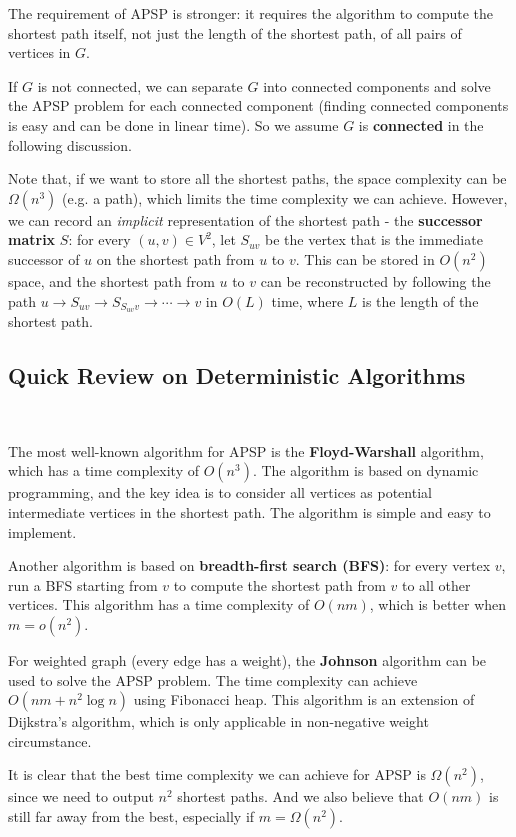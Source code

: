 \documentclass[11pt]{article}
\theoremstyle{plain}
\begin{document}
The requirement of APSP is stronger: it requires the algorithm to compute the shortest path itself, not just the length of the shortest path, of all pairs of vertices in $G$. 

If $G$ is not connected, we can separate $G$ into connected components and solve the APSP problem for each connected component (finding connected components is easy and can be done in linear time). So we assume $G$ is \textbf{connected} in the following discussion.

Note that, if we want to store all the shortest paths, the space complexity can be $\Omega(n^3)$ (e.g. a path), which limits the time complexity we can achieve. However, we can record an \emph{implicit} representation of the shortest path - the \textbf{successor matrix} $S$: for every $(u,v)\in V^2$, let $S_{uv}$ be the vertex that is the immediate successor of $u$ on the shortest path from $u$ to $v$. This can be stored in $O(n^2)$ space, and the shortest path from $u$ to $v$ can be reconstructed by following the path $u\to S_{uv}\to S_{S_{uv}v}\to\cdots\to v$ in $O(L)$ time, where $L$ is the length of the shortest path.

\subsection{Quick Review on Deterministic Algorithms}\

The most well-known algorithm for APSP is the \textbf{Floyd-Warshall} algorithm, which has a time complexity of $O(n^3)$. The algorithm is based on dynamic programming, and the key idea is to consider all vertices as potential intermediate vertices in the shortest path. The algorithm is simple and easy to implement.

Another algorithm is based on \textbf{breadth-first search (BFS)}: for every vertex $v$, run a BFS starting from $v$ to compute the shortest path from $v$ to all other vertices. This algorithm has a time complexity of $O(nm)$, which is better when $m=o(n^2)$.

For weighted graph (every edge has a weight), the \textbf{Johnson} algorithm can be used to solve the APSP problem. The time complexity can achieve $O(nm+n^2\log n)$ using Fibonacci heap. This algorithm is an extension of Dijkstra's algorithm, which is only applicable in non-negative weight circumstance. 

It is clear that the best time complexity we can achieve for APSP is $\Omega(n^2)$, since we need to output $n^2$ shortest paths. And we also believe that $O(nm)$ is still far away from the best, especially if $m=\Omega(n^2)$.
\end{document}
